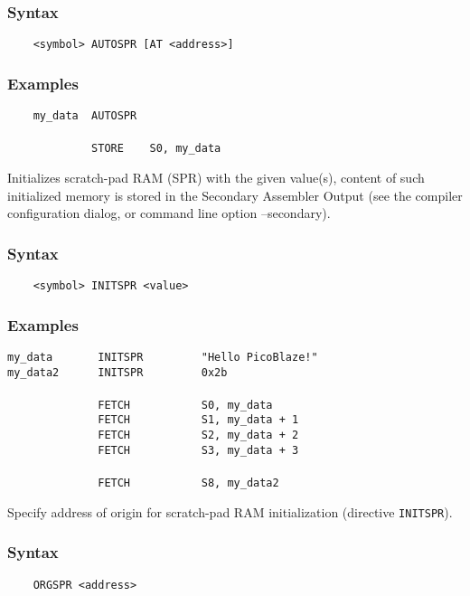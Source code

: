         \subsubsection{Syntax}
            \verb'    <symbol> AUTOSPR [AT <address>]'

        \subsubsection{Examples}
            \verb'    my_data  AUTOSPR'\\
            \verb''\\
            \verb'             STORE    S0, my_data'

    \clearpage
        Initializes scratch-pad RAM (SPR) with the given value(s), content of such initialized memory is stored in the Secondary Assembler Output (see the compiler configuration dialog, or command line option --secondary).

        \subsubsection{Syntax}
            \verb'    <symbol> INITSPR <value>'

        \subsubsection{Examples}
            \verb'my_data       INITSPR         "Hello PicoBlaze!"'\\
            \verb'my_data2      INITSPR         0x2b'\\
            \verb''\\
            \verb'              FETCH           S0, my_data'\\
            \verb'              FETCH           S1, my_data + 1'\\
            \verb'              FETCH           S2, my_data + 2'\\
            \verb'              FETCH           S3, my_data + 3'\\
            \verb''\\
            \verb'              FETCH           S8, my_data2'

        Specify address of origin for scratch-pad RAM initialization (directive \texttt{INITSPR}).

        \subsubsection{Syntax}
            \verb'    ORGSPR <address>'

